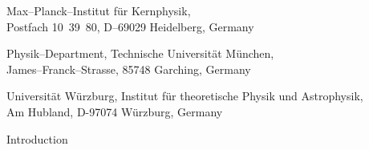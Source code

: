 \documentclass[12pt,a4paper]{article}
\makeatletter
\renewcommand{\section}{\@startsection{section}{1}{0em}{-\baselineskip}%
{\baselineskip}{\normalfont\large\bfseries}}
\newcommand{\GLOBES}{{\sf GLoBES}}
\newcommand{\GLOBESN}{{\sf GLoBES~3.0}}
\makeatother
\begin{document}
\begin{titlepage}
{\begin{center}
\vspace*{1mm}

\footnotemark[2]%
       Max--Planck--Institut f\"ur Kernphysik,  \\
       Postfach 10~39~80, D--69029 Heidelberg, Germany 

\vspace*{1mm}

\footnotemark[3]%
       Physik--Department, Technische Universit\"at M\"unchen, \\
       James--Franck--Strasse, 85748 Garching, Germany

\vspace*{1mm}

\footnotemark[4]%
       Universit\"at W\"urzburg, 
       Institut f\"ur theoretische Physik und Astrophysik, \\
       Am Hubland, D-97074 W\"urzburg, Germany

\end{center}}

\vspace*{1cm}


\begin{abstract}
We present Version 3.0 of the GLoBES (``General Long Baseline Experiment Simulator'') software, which is
a simulation tool for short- and long-baseline neutrino oscillation experiments. As new features, \GLOBESN\ allows the simulation of experiments with multiple discrete sources and detectors by the 
concept of user-defined systematics.
In addition, the combination with external information, such as from different experiment classes, is 
simplified by the concept of user-defined priors. As far as the probability calculation is concerned, \GLOBES\ 
now provides an interface for the inclusion of non-standard physics without re-compliation of the software. 
The set of experiment descriptions coming with \GLOBES\ has been updated. For example, built-in fluxes are now
provided for the simulation of beta beams.
\end{abstract}


\vspace*{.5cm}


\end{titlepage}

\newpage

\renewcommand{\thefootnote}{\arabic{footnote}}
\setcounter{footnote}{0}

\section{Introduction}
\end{document}
